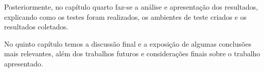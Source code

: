 Posteriormente, no capítulo quarto faz-se a análise e apresentação dos resultados, explicando como os testes foram realizados, os ambientes de teste criados e os resultados coletados.

No quinto capítulo temos a discussão final e a exposição de algumas conclusões mais relevantes, além dos trabalhos futuros e considerações finais sobre o trabalho apresentado.


%
%
%


